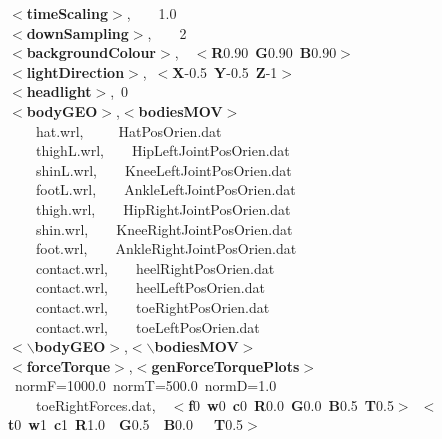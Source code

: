 \documentclass[singlecolumn,12pt]{article}
\newcommand{\hlstd}[1]{\textcolor[rgb]{0,0,0}{#1}}
\newcommand{\hlkey}[1]{\textcolor[rgb]{0,0,1}{\bf{#1}}}
\newcommand{\hlnum}[1]{\textcolor[rgb]{0.66,0,0.66}{#1}}
\begin{document}
\begin{landscape}
\footnotesize \noindent \ttfamily
\hlstd{}\hlkey{$<$timeScaling$>$}\hlstd{,\hlstd{\ \ \ \ }}\hlnum{1.0\\
}\hlstd{}\hlkey{$<$downSampling$>$}\hlstd{,\hlstd{\ \ \ \ }}\hlnum{2\\
}\hlstd{}\hlkey{$<$backgroundColour$>$}\hlstd{,\hlstd{\ \ }}\hlkey{$<$R}\hlnum{0.90\ }\hlkey{G}\hlnum{0.90\ }\hlkey{B}\hlnum{0.90}\hlkey{$>$}\hlstd{\\
}\hlkey{$<$lightDirection$>$}\hlstd{,\ }\hlkey{$<$X}\hlnum{-0.5\ }\hlkey{Y}\hlnum{-0.5\ }\hlkey{Z}\hlnum{-1}\hlkey{$>$}\hlstd{\\
}\hlkey{$<$headlight$>$}\hlstd{,\ }\hlnum{0\\
}\hlstd{}\hlkey{$<$bodyGEO$>$}\hlstd{,}\hlkey{$<$bodiesMOV$>$}\hlstd{\\
\hlstd{\ \ \ \ }hat.wrl,\hlstd{\ \ \ \ \ }HatPosOrien.dat\\
\hlstd{\ \ \ \ }thighL.wrl,\hlstd{\ \ \ \ }HipLeftJointPosOrien.dat\\
\hlstd{\ \ \ \ }shinL.wrl,\hlstd{\ \ \ \ }KneeLeftJointPosOrien.dat\\
\hlstd{\ \ \ \ }footL.wrl,\hlstd{\ \ \ \ }AnkleLeftJointPosOrien.dat\\
\hlstd{\ \ \ \ }thigh.wrl,\hlstd{\ \ \ \ }HipRightJointPosOrien.dat\\
\hlstd{\ \ \ \ }shin.wrl,\hlstd{\ \ \ \ }KneeRightJointPosOrien.dat\\
\hlstd{\ \ \ \ }foot.wrl,\hlstd{\ \ \ \ }AnkleRightJointPosOrien.dat\\
\hlstd{\ \ \ \ }contact.wrl,\hlstd{\ \ \ \ }heelRightPosOrien.dat\\
\hlstd{\ \ \ \ }contact.wrl,\hlstd{\ \ \ \ }heelLeftPosOrien.dat\\
\hlstd{\ \ \ \ }contact.wrl,\hlstd{\ \ \ \ }toeRightPosOrien.dat\\
\hlstd{\ \ \ \ }contact.wrl,\hlstd{\ \ \ \ }toeLeftPosOrien.dat\\
}\hlkey{$<$$\backslash$bodyGEO$>$}\hlstd{,}\hlkey{$<$$\backslash$bodiesMOV$>$}\hlstd{\\
}\hlkey{$<$forceTorque$>$}\hlstd{,}\hlkey{$<$genForceTorquePlots$>$}\hlstd{\ normF=}\hlnum{1000.0\ }\hlstd{normT=}\hlnum{500.0\ }\hlstd{normD=}\hlnum{1.0\\
\hlstd{\ \ \ \ }}\hlstd{toeRightForces.dat,\hlstd{\ \ }}\hlkey{$<$f}\hlnum{0\ }\hlkey{w}\hlnum{0\ }\hlkey{c}\hlnum{0\ }\hlkey{R}\hlnum{0.0\ }\hlkey{G}\hlnum{0.0\ }\hlkey{B}\hlnum{0.5\ }\hlkey{T}\hlnum{0.5}\hlkey{$>$}\hlstd{\ }\hlkey{$<$t}\hlnum{0\ }\hlkey{w}\hlnum{1\ }\hlkey{c}\hlnum{1\ }\hlkey{R}\hlnum{1.0\ \ }\hlkey{G}\hlnum{0.5\ \ }\hlkey{B}\hlnum{0.0\ \ \ }\hlkey{T}\hlnum{0.5}\hlkey{$>$}\hlstd{\\
}
\end{landscape}
\end{document}
